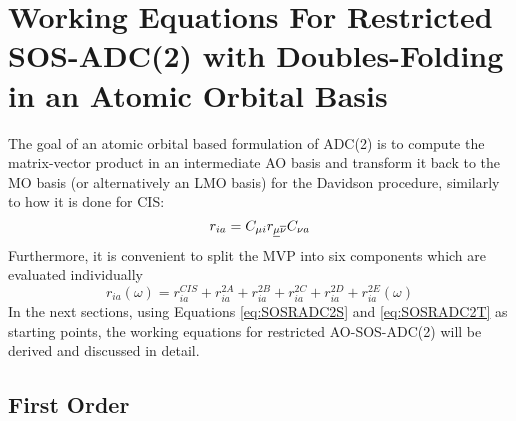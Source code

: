 \section{Working Equations For Restricted SOS-ADC(2) with Doubles-Folding in an Atomic Orbital Basis}

The goal of an atomic orbital based formulation of ADC(2) is to compute the matrix-vector product in an intermediate AO basis and transform it back to the MO basis (or alternatively an LMO basis) for the Davidson procedure, similarly to how it is done for CIS:
\begin{equation}
r_{ia} = C_{\mu i} r_{\underline{\mu} \overline{\nu}} C_{\nu a}
\end{equation}
\noindent Furthermore, it is convenient to split the MVP into six components which are evaluated individually
\begin{equation}
r_{ia}(\omega) = r_{ia}^{CIS} + r_{ia}^{2A} + r_{ia}^{2B} + r_{ia}^{2C} + r_{ia}^{2D} + r_{ia}^{2E}(\omega)
\end{equation}
\noindent In the next sections, using Equations \ref{eq:SOSRADC2S} and \ref{eq:SOSRADC2T} as starting points, the working equations for restricted AO-SOS-ADC(2) will be derived and discussed in detail. 

\subsection{First Order}

